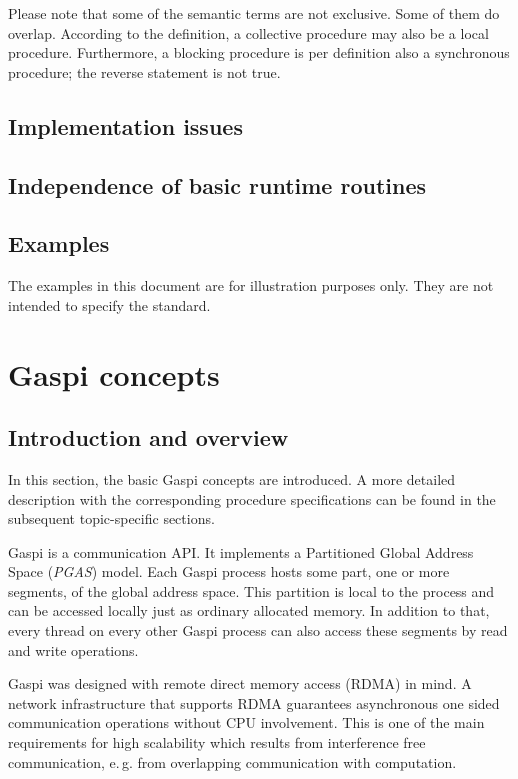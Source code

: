 \documentclass{article}
\newlength{\st}\setlength{\st}{0pt}
\newcommand{\GASPI}{{\sc Gaspi}}
\begin{document}
Please note that some of the semantic terms are not exclusive. Some of
them do overlap. According to the definition, a collective procedure
may also be a local procedure. Furthermore, a blocking procedure is
per definition also a synchronous procedure; the
reverse statement is not true.

\subsection{Implementation issues}

\subsection{Independence of basic runtime routines}

\subsection{Examples}

The examples in this document are for illustration purposes only. They are not intended
to specify the standard. 


\section{\GASPI{} concepts}

\subsection{Introduction and overview}

In this section, the basic \GASPI{} concepts are introduced. A more detailed
description with the corresponding procedure specifications can be found
in the subsequent topic-specific sections.

\GASPI{} is a communication API.  It implements a Partitioned Global
Address Space (\emph{PGAS}) model. Each \GASPI{} process hosts some
part, one or more segments, of the global address space. This
partition is local to the process and can be accessed locally just as
ordinary allocated memory. In addition to that, every thread on every
other \GASPI{} process can also access  these segments by read
and write operations.

\GASPI{} was designed with remote direct memory access (RDMA) in mind.
A network infrastructure that supports RDMA guarantees asynchronous one
sided communication operations without CPU involvement. This is one of
the main requirements for high scalability which results from
interference free communication, e.\,g. from overlapping communication
with computation.
\end{document}
